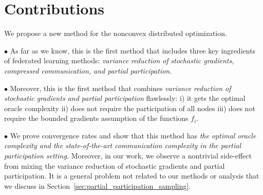 \documentclass{article}
\newcommand{\algorithmname}{DASHA-PP}
\begin{document}
\section{Contributions}
We propose a new method \algname{\algorithmname} for the nonconvex distributed optimization.

$\bullet$ As far as we know, this is the first method that includes three key ingredients of federated learning methods: \textit{variance reduction of stochastic gradients, compressed communication, and partial participation.} 

$\bullet$ Moreover, this is the first method that combines \textit{variance reduction of stochastic gradients and partial participation} flawlessly: i) it gets the optimal oracle complexity ii) does not require the participation of all nodes iii) does not require the bounded gradients assumption of the functions $f_i$.

$\bullet$ We prove convergence rates and show that this method has \textit{the optimal oracle complexity and the state-of-the-art communication complexity in the partial participation setting.} Moreover, in our work, we observe a nontrivial side-effect from mixing the variance reduction of stochastic gradients and partial participation. It is a general problem not related to our methods or analysis that we discuss in Section~\ref{sec:partial_participation_sampling}.
\end{document}
